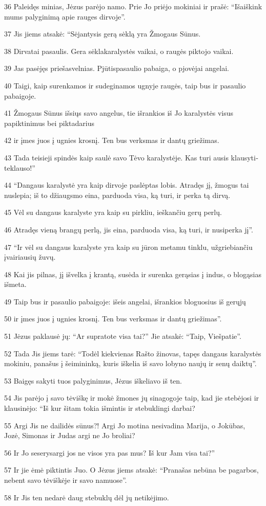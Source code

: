\par 36 Paleidęs minias, Jėzus parėjo namo. Prie Jo priėjo mokiniai ir prašė: “Išaiškink mums palyginimą apie rauges dirvoje”. 
\par 37 Jis jiems atsakė: “Sėjantysis gerą sėklą yra Žmogaus Sūnus. 
\par 38 Dirva­tai pasaulis. Gera sėkla­karalystės vaikai, o raugės­ piktojo vaikai. 
\par 39 Jas pasėjęs priešas­velnias. Pjūtis­pasaulio pabaiga, o pjovėjai­ angelai. 
\par 40 Taigi, kaip surenkamos ir sudeginamos ugnyje raugės, taip bus ir pasaulio pabaigoje. 
\par 41 Žmogaus Sūnus išsiųs savo angelus, tie išrankios iš Jo karalystės visus papiktinimus bei piktadarius 
\par 42 ir įmes juos į ugnies krosnį. Ten bus verksmas ir dantų griežimas. 
\par 43 Tada teisieji spindės kaip saulė savo Tėvo karalystėje. Kas turi ausis klausyti­teklauso!” 
\par 44 “Dangaus karalystė yra kaip dirvoje paslėptas lobis. Atradęs jį, žmogus tai nuslepia; iš to džiaugsmo eina, parduoda visa, ką turi, ir perka tą dirvą. 
\par 45 Vėl su dangaus karalyste yra kaip su pirkliu, ieškančiu gerų perlų. 
\par 46 Atradęs vieną brangų perlą, jis eina, parduoda visa, ką turi, ir nusiperka jį”. 
\par 47 “Ir vėl su dangaus karalyste yra kaip su jūron metamu tinklu, užgriebiančiu įvairiausių žuvų. 
\par 48 Kai jis pilnas, jį išvelka į krantą, susėda ir surenka gerąsias į indus, o blogąsias išmeta. 
\par 49 Taip bus ir pasaulio pabaigoje: išeis angelai, išrankios bloguosius iš gerųjų 
\par 50 ir įmes juos į ugnies krosnį. Ten bus verksmas ir dantų griežimas”. 
\par 51 Jėzus paklausė jų: “Ar supratote visa tai?” Jie atsakė: “Taip, Viešpatie”. 
\par 52 Tada Jis jiems tarė: “Todėl kiekvienas Rašto žinovas, tapęs dangaus karalystės mokiniu, panašus į šeimininką, kuris iškelia iš savo lobyno naujų ir senų daiktų”. 
\par 53 Baigęs sakyti tuos palyginimus, Jėzus iškeliavo iš ten. 
\par 54 Jis parėjo į savo tėviškę ir mokė žmones jų sinagogoje taip, kad jie stebėjosi ir klausinėjo: “Iš kur šitam tokia išmintis ir stebuklingi darbai? 
\par 55 Argi Jis ne dailidės sūnus?! Argi Jo motina nesivadina Marija, o Jokūbas, Jozė, Simonas ir Judas argi ne Jo broliai? 
\par 56 Ir Jo seserys­argi jos ne visos yra pas mus? Iš kur Jam visa tai?” 
\par 57 Ir jie ėmė piktintis Juo. O Jėzus jiems atsakė: “Pranašas nebūna be pagarbos, nebent savo tėviškėje ir savo namuose”. 
\par 58 Ir Jis ten nedarė daug stebuklų dėl jų netikėjimo.



